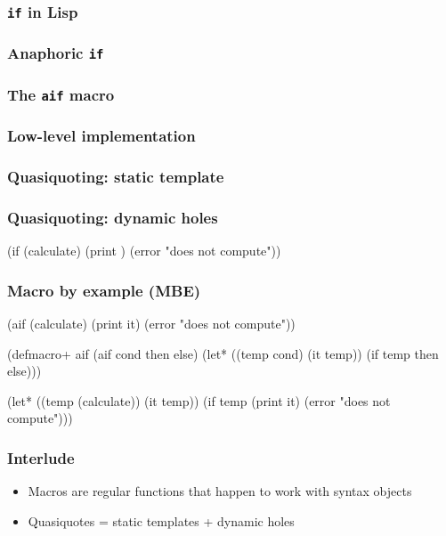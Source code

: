 \documentclass[hyperref={bookmarks=false}]{beamer}
\begin{document}
\begin{frame}[fragile]
\frametitle<1>{\texttt{if} in Lisp}
\frametitle<2>{Anaphoric \texttt{if}}
\frametitle<3>{The \texttt{aif} macro}
\frametitle<4>{Low-level implementation}
\frametitle<5>{Quasiquoting: static template}
\frametitle<6>{Quasiquoting: dynamic holes}
\begin{semiverbatim}
(if (calculate)
  (print )
  (error "does not compute"))


\end{semiverbatim}
\end{frame}

\begin{frame}[fragile]
\frametitle{Macro by example (MBE)}
\begin{semiverbatim}
(aif (calculate)
  (print it)
  (error "does not compute"))

(defmacro+ aif
  \alert{(aif cond then else)}
  (let* ((temp \alert{cond})
         (it temp))
    (if temp
        \alert{then}
        \alert{else})))

(let* ((temp (calculate))
       (it temp))
  (if temp
    (print it)
    (error "does not compute")))
\end{semiverbatim}
\end{frame}

\begin{frame}[fragile]
\frametitle{Interlude}
\begin{itemize}
\item Macros are regular functions that happen to work with syntax objects
\item Quasiquotes = static templates + dynamic holes
\end{itemize}
\end{frame}
\end{document}
